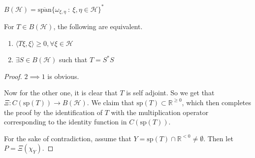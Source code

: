 \begin{theorem}
  $B(\mathcal{H}) = \overline{\textrm{span}}\{ \omega_{\xi, \eta}
  \ : \    \xi, \eta \in \mathcal{H} \}^*$
\end{theorem}

\begin{proposition}
  For $T \in B(\mathcal{H})$, the following are equivalent.
  \begin{enumerate}[label=(\arabic*)]
    \item $\langle T \xi ,  \xi \rangle \ge 0, \forall \xi
      \in \mathcal{H}$
    \item $\exists S \in B(\mathcal{H})$ such that  $T = S^*S$
  \end{enumerate}
\end{proposition}
\begin{proof}
  $2 \implies 1$ is obvious.

  Now for the other one, it is clear that $T$ is self adjoint. So we
  get that $\Xi: C(\textrm{sp}(T)) \to B(\mathcal{H})$. We claim that
  $\textrm{sp}(T) \subset \mathbb{R}^{\ge 0}$, which then completes
  the proof by the identification of $T$ with the multiplication
  operator corresponding to the identity function in $C(\textrm{sp}(T))$.

  For the sake of contradiction, assume that $Y = \textrm{sp}(T) \cap
  \mathbb{R}^{< 0} \neq \emptyset$. Then let $P = \Xi(\chi_Y)$.
\end{proof}
